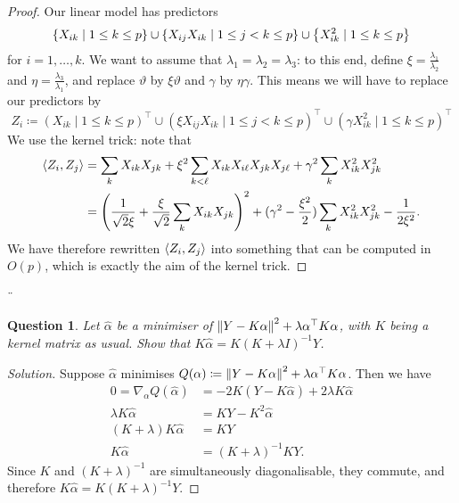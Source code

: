 \documentclass{article}
\theoremstyle{plain}
\newtheorem{question}{Question}
\theoremstyle{remark}
\newenvironment{solution}{\begin{proof}[Solution]\renewcommand\qedsymbol{}}{\end{proof}}
\renewcommand{\theta}{\vartheta}
\DeclarePairedDelimiter{\ang}{\langle}{\rangle}
\newcommand{\T}{^\top} %
\newcommand\ceq\coloneqq %
\begin{document}
\begin{proof}
	Our linear model has predictors
	\[
	\qty{X_{ik} \mid 1 \leq k \leq p} \cup \qty{X_{ij} X_{ik} \mid 1 \leq j < k \leq p} \cup \qty{X_{ik}^2 \mid 1 \leq k \leq p}
	\]
	for $i = 1, \dotsc, k$. We want to assume that $\lambda_1 = \lambda_2 = \lambda_3$: to this end, define $\xi = \frac{\lambda_1}{\lambda_2}$ and $\eta = \frac{\lambda_3}{\lambda_1}$, and replace $\theta$ by $\xi\theta$ and $\gamma$ by $\eta\gamma$. This means we will have to replace our predictors by
	\[
	Z_i \ceq 
	(X_{ik} \mid 1 \leq k \leq p)\T \cup (\xi X_{ij} X_{ik} \mid 1 \leq j < k \leq p)\T \cup (\gamma X_{ik}^2 \mid 1 \leq k \leq p)\T
	\]
	We use the kernel trick: note that
	\begin{align*}
	\ang{Z_i, Z_j} &= \sum_k X_{ik}X_{jk} + \xi^2 \sum_{k < \ell} X_{ik} X_{i\ell} X_{jk} X_{j\ell} + \gamma^2 \sum_k X_{ik}^2 X_{jk}^2 \\
	&= \qty(\frac{1}{\sqrt 2\xi} + \frac{\xi}{\sqrt 2}\sum_k X_{ik}X_{jk})^2 + (\gamma^2 - \frac{\xi^2}{2})\sum_k X_{ik}^2 X_{jk}^2 - \frac{1}{2\xi^2}.
	\end{align*}
	We have therefore rewritten $\ang{Z_i, Z_j}$ into something that can be computed in $O(p)$, which is exactly the aim of the kernel trick.
\end{proof}

¨

\begin{question}
	Let $\hat\alpha$ be a minimiser of $\norm{Y - K\alpha}^2 + \lambda \alpha\T K\alpha$, with $K$ being a kernel matrix as usual. Show that $K\hat\alpha = K(K + \lambda I)^{-1} Y$. 
\end{question}

\begin{solution}
	Suppose $\hat\alpha$ minimises $Q(\alpha) \ceq \norm{Y - K\alpha}^2 + \lambda \alpha\T K\alpha$. Then we have
	\begin{align*}
		0 = \nabla_\alpha Q(\hat\alpha) &= -2 K (Y - K\hat\alpha) + 2\lambda K\hat\alpha \\
		\lambda K\hat\alpha &= KY - K^2\hat\alpha \\
		(K + \lambda) K\hat\alpha &= KY \\
		K\hat\alpha &= (K + \lambda)^{-1} KY.
	\end{align*}
Since $K$ and $(K + \lambda)^{-1}$ are simultaneously diagonalisable, they commute, and therefore $K\hat\alpha = K(K + \lambda)^{-1} Y$. 
\end{solution}
\end{document}
